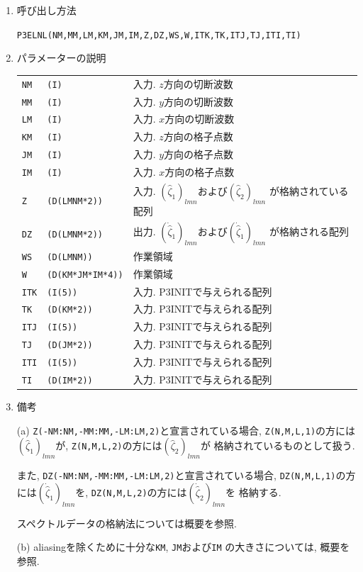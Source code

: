 \documentclass[a4j,fleqn]{jarticle}
\begin{document}
\begin{enumerate}
\item 呼び出し方法 

{\tt P3ELNL(NM,MM,LM,KM,JM,IM,Z,DZ,WS,W,ITK,TK,ITJ,TJ,ITI,TI)}
  
\item パラメーターの説明

\begin{tabular}{lll}
{\tt NM} & {\tt (I)} & 入力. $z$方向の切断波数\\
{\tt MM} & {\tt (I)} & 入力. $y$方向の切断波数\\
{\tt LM} & {\tt (I)} & 入力. $x$方向の切断波数\\
{\tt KM} & {\tt (I)} & 入力. $z$方向の格子点数\\
{\tt JM} & {\tt (I)} & 入力. $y$方向の格子点数\\
{\tt IM} & {\tt (I)} & 入力. $x$方向の格子点数\\
{\tt Z} & {\tt (D(LMNM*2))} & 
 入力. $(\hat{\zeta}_1)_{lmn}$および$(\hat{\zeta}_2)_{lmn}$
  が格納されている配列\\
{\tt DZ} & {\tt (D(LMNM*2))} & 
 出力. $(\dot{\hat{\zeta}}_1)_{lmn}$および$(\dot{\hat{\zeta}}_1)_{lmn}$
 が格納される配列\\
{\tt WS} & {\tt (D(LMNM))} & 作業領域\\
{\tt W} & {\tt (D(KM*JM*IM*4))} & 作業領域\\
{\tt ITK} & {\tt (I(5))} & 入力. P3INITで与えられる配列\\
{\tt TK} & {\tt (D(KM*2))} & 入力. P3INITで与えられる配列\\
{\tt ITJ} & {\tt (I(5))} & 入力. P3INITで与えられる配列\\
{\tt TJ} & {\tt (D(JM*2))} & 入力. P3INITで与えられる配列\\
{\tt ITI} & {\tt (I(5))} & 入力. P3INITで与えられる配列\\
{\tt TI} & {\tt (D(IM*2))} & 入力. P3INITで与えられる配列
\end{tabular}

\item 備考

(a) {\tt Z(-NM:NM,-MM:MM,-LM:LM,2)}と宣言されている場合,
    {\tt Z(N,M,L,1)}の方には$(\hat{\zeta}_1)_{lmn}$が,
    {\tt Z(N,M,L,2)}の方には$(\hat{\zeta}_2)_{lmn}$が
    格納されているものとして扱う.
    
    また, 
    {\tt DZ(-NM:NM,-MM:MM,-LM:LM,2)}と宣言されている場合,
    {\tt DZ(N,M,L,1)}の方には$(\dot{\hat{\zeta}}_1)_{lmn}$を,
    {\tt DZ(N,M,L,2)}の方には$(\dot{\hat{\zeta}}_2)_{lmn}$を
    格納する.
        
    スペクトルデータの格納法については概要を参照.

(b) aliasingを除くために十分な{\tt KM}, {\tt JM}および{\tt IM}
の大きさについては, 概要を参照.

\end{enumerate}
\end{document}

